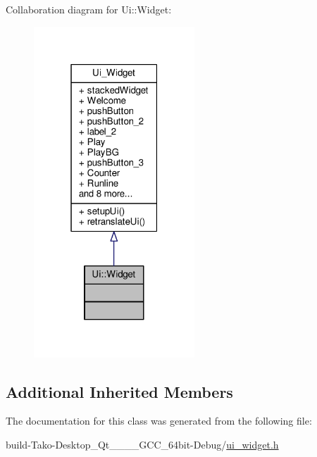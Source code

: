 Collaboration diagram for Ui\+:\+:Widget\+:
\nopagebreak
\begin{figure}[H]
\begin{center}
\leavevmode
\includegraphics[width=171pt]{classUi_1_1Widget__coll__graph}
\end{center}
\end{figure}
\subsection*{Additional Inherited Members}


The documentation for this class was generated from the following file\+:\begin{DoxyCompactItemize}
\item 
build-\/\+Tako-\/\+Desktop\+\_\+\+Qt\+\_\+\_\+\_\+\_\+\+G\+C\+C\+\_\+64bit-\/\+Debug/\hyperlink{ui__widget_8h}{ui\+\_\+widget.\+h}\end{DoxyCompactItemize}
